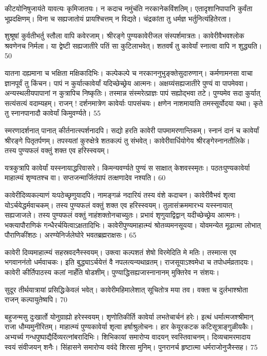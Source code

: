   कीटयोनिषुजायंते यावत्यः कृमिजातयः।
 न कदाच नमुंचंति नरकानेकविंशतिम्।
 एतादृशानिपापानि कुर्वंता भूप्रदक्षिणम्।
 विना च सह्यजातोयं प्रायश्चित्तम् न विद्यते।
 चंद्रकांता तु धर्मज्ञ भर्तुनित्यंहितेरता।
 
शुश्रूषां कुर्वतीभर्तु स्तौला वापि कवेरजाम्।
 श्रीरङ्गे पुण्यकावेरीजल संस्पर्शमात्रतः।
 कावेरीवैभवश्लोक श्रवणेनच निर्मला।
 या द्वेष्टी सह्यजातीरे पतिं सा कुटिलाभवेत्।
 शतवर्षं तु कावेर्यां स्नात्वा वापि न शुद्ध्यति।
 50

  यातना दह्यमाना च भक्षिता मक्षिकादिभिः।
 कल्पेकल्पे च नरकाननुभुङ्क्तेसुदारुणान्।
 कर्मणामनसा वाचा ज्ञानपूर्वं तु किंचन।
 पापं न कुर्यात्कावेर्यां यदिच्छेच्छ्रेय आत्मनः।
 अक्षय्यंसह्यजातीरे पुण्यं वा पापमेववा।
 अन्यस्थलीयपापानां न कुत्रापिच निष्कृतिः।
 तस्मान्न संस्मरेत्प्राज्ञः पापं सह्योद्भवा तटे।
 पुण्यमेव सदा कुर्यात् सत्यंसत्यं वदाम्यहम्।
 राजन् ! दर्शनमात्रेण कावेर्याः पापसंचयः।
 क्षणेन नाशमायाति तमस्सूर्योदया यथा।
 कृते तु स्नानपानादौ कावेर्यां किमुवर्ण्यते।
 55

  स्मरणादर्शनात् पानात् कीर्तनात्स्पर्शनादपि।
 सद्यो हरति कावेरी पापमामरणान्तिकम्।
 स्नानं दानं च कावेर्यां श्रीरङ्गे पितृतर्पणम्।
 तपस्यतां कुरुक्षेत्रे शतकल्पं तु संभवेत्।
 कावेरीवार्धियोगेय श्रीरङ्गेस्नानतौलिके।
 तस्य पुण्यफलं वक्तुं शक्त एव हरिस्स्वयम्।
 
यत्रकुत्रापि कावेर्यां यस्स्नायाद्धरिवासरे।
 किमन्यवर्ण्यते पुण्यं स साक्षात् केशवस्स्मृतः।
 पठतःपुण्यकावेर्या माहात्म्यं शृण्वतश्च वा।
 सप्तजन्मार्जितंपापं तत्क्षणादेव नश्यति।
 60

  कावेरीदिव्यकल्याणं यःपठेच्छृणुयादपि।
 नामङ्गळं नदारियं तस्य वंशे कदाचन।
 कावेरीवैभवं शृत्वा योऽर्चयेद्धर्मवाचकम्।
 तस्य पुण्यफलं वक्तुं शक्त एव हरिस्स्वयम्।
 तुलासंक्रममारभ्य यस्स्नायात् सह्यजाजले।
 तस्य पुण्यफलं वक्तुं नाहंशक्तोनचाच्युतः।
 प्रभावं शृणुयाद्विद्वान् यदीच्छेच्छ्रेय आत्मनः।
 भक्त्यापौराणिकं गन्धैरर्चयित्वाऽक्षतादिभिः।
 कावेरीपुण्यमाहात्म्यं श्रोतव्यमनसूयया।
 योवमन्येत मूढात्मा लोभात् पौराणिकींशठः।
 अरण्येनिर्जलेघोरे भवतब्रह्मराक्षसः।
 65

  कावेरी दिव्यमाहात्म्यं सहस्रवदनैस्स्वयम्।
 उक्त्वा कल्पशतं शेषो विरमेदिति मे मतिः।
 तस्मात्स एव भगवाननंतो धर्मवाचकः।
 इति बुद्ध्याऽर्चयेत्तं वै नपलत्यन्यथाव्रतम्।
 राजसूयाऽश्वमेधा च तपोधर्मव्रतादयः।
 कावेरी कीर्तिपाठस्य कलां नाहँति षोडशीम्।
 पुण्याद्धिसह्यजास्नानानम् मुक्तिरेव न संशयः।
 
सुदूर तीर्थयात्रायां प्रसिद्धिःकेवलं भवेत्।
 कावेरीमहिमालेशात् सूचितोत्र मया तव।
 वक्ता च दुर्लभाश्श्रोता राजन् कल्पायुतेष्वपि।
 70

  बहुजन्मसु दुःखार्तो योनुग्राह्यो हरेस्स्वयम्।
 शृणोतिकीर्ति कावेर्या लभतेचार्चनं हरेः।
 इत्थं धर्मात्मजश्श्रीमान् राजा धौम्यमुनीरितम्।
 माहात्म्यं पुण्यकावेर्या शृत्वा हर्षाश्रुलोचनः।
 हार केयूरकटक कटिसूत्राङ्गुळीयकैः।
 अभ्यर्च्य गन्धपुष्पाद्यैर्दिव्यरत्नांबरादिभिः।
 शिभिकायां समारोप्य वादयन् स्वस्तिवाचनम्।
 दिव्यचामरमादाय स्वयं संवीजयन् शनैः।
 सिंहासने समारोप्य ववंदे शिरसा मुनिम्।
 पुनरानर्च हृष्टात्मा धर्मराजोनुजैस्सह।
 75

